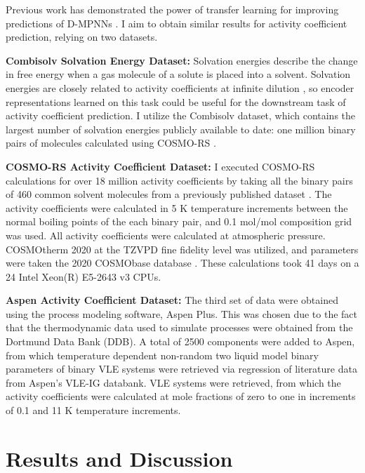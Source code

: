 Previous work has demonstrated the power of transfer learning for improving predictions of D-MPNNs \cite{Vermeire2021}. I aim to obtain similar results for activity coefficient prediction, relying on two datasets.

\noindent
\textbf{Combisolv Solvation Energy Dataset:} Solvation energies describe the change in free energy when a gas molecule of a solute is placed into a solvent. Solvation energies are closely related to activity coefficients at infinite dilution \cite{Moine2017}, so encoder representations learned on this task could be useful for the downstream task of activity coefficient prediction. I utilize the Combisolv dataset, which contains the largest number of solvation energies publicly available to date: one million binary pairs of molecules calculated using COSMO-RS \cite{Vermeire2021}.

\noindent
\textbf{COSMO-RS Activity Coefficient Dataset:} I executed COSMO-RS calculations for over 18 million activity coefficients by taking all the binary pairs of 460 common solvent molecules from a previously published dataset \cite{Amar2019}. The activity coefficients were calculated in 5 K temperature increments between the normal boiling points of the each binary pair, and 0.1 mol/mol composition grid was used. All activity coefficients were calculated at atmospheric pressure. COSMOtherm 2020 at the TZVPD fine fidelity level was utilized, and parameters were taken the 2020 COSMObase database \cite{Klamt2010}. These calculations took 41 days on a 24 Intel Xeon(R) E5-2643 v3 CPUs. 

\noindent
\textbf{Aspen Activity Coefficient Dataset:} The third set of data were obtained using the process modeling software, Aspen Plus. This was chosen due to the fact that the thermodynamic data used to simulate processes were obtained from the Dortmund Data Bank (DDB). A total of 2500 components were added to Aspen, from which temperature dependent non-random two liquid model binary parameters of binary VLE systems were retrieved via regression of literature data from Aspen’s VLE-IG databank. VLE systems were retrieved, from which the activity coefficients were calculated at mole fractions of zero to one in increments of 0.1 and 11 K temperature increments. 


\section{Results and Discussion}

